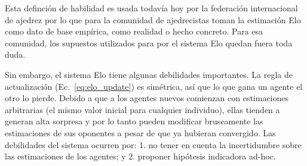 \documentclass[a4paper,10pt]{book}
\theoremstyle{definition}
\begin{document}
\begin{center}
\end{center}

Esta definci\'on de habilidad es usada todav\'ia hoy por la federaci\'on internacional de ajedrez por lo que para la comunidad de ajedrecistas toman la estimaci\'on Elo como dato de base emp\'irica, como realidad o hecho concreto.
Para esa comunidad, los supuestos utilizados para por el sistema Elo quedan fuera toda duda.


Sin embargo, el sistema Elo tiene algunas debilidades importantes. 
La regla de actualizaci\'on (Ec.~\eqref{eq:elo_update}) es sim\'etrica, as\'i que lo que gana un agente el otro lo pierde.
Debido a que a los agentes nuevos comienzan con estimaciones arbitrarias (el mismo valor inicial para cualquier individuo), ellas tienden a generan alta sorpresa y por lo tanto pueden modificar bruscamente las estimaciones de sus oponentes a pesar de que ya hubieran convergido.
Las debilidades del sistema ocurren por: 1. no tener en cuenta la incertidumbre sobre las estimaciones de los agentes; y 2. proponer hip\'otesis indicadora ad-hoc.



\end{document}
